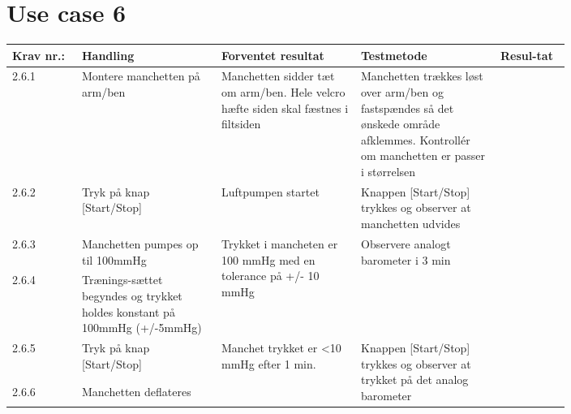 \section{Use case 6}
						\begin{longtable}{|p{0.1\linewidth}|p{0.2\linewidth}|p{0.2\linewidth}|p{0.2\linewidth}|p{0.1\linewidth}|}
								\hline
								\rowcolor{usDef}
								Krav nr.: & Handling & Forventet resultat & Testmetode & Resul-tat  \\\hline
								2.6.1 & Montere manchetten på arm/ben & Manchetten sidder tæt om arm/ben. Hele velcro hæfte siden skal fæstnes i filtsiden & Manchetten trækkes løst over arm/ben og fastspændes så det ønskede område afklemmes. Kontrollér om manchetten er passer i størrelsen & \\ \hline
								2.6.2 & Tryk på knap [Start/Stop] & Luftpumpen startet & Knappen [Start/Stop] trykkes og observer at manchetten udvides  & \\ \hline
								2.6.3 & Manchetten pumpes op til 100mmHg & \multirow{2}{\linewidth}{Trykket i mancheten er 100 mmHg med en tolerance på +/- 10 mmHg}& \multirow{2}{\linewidth}{Observere analogt barometer i 3 min}& \multirow{2}{\linewidth}{} \\ \cline{1-2}
								2.6.4 & Trænings-sættet begyndes og trykket holdes konstant på 100mmHg (+/-5mmHg) & & & \\ \hline
								2.6.5 & Tryk på knap [Start/Stop]  & \multirow{2}{\linewidth}{Manchet trykket er \textless  10 mmHg efter 1 min.} & \multirow{2}{\linewidth}{Knappen [Start/Stop] trykkes og observer at trykket på det analog barometer} & \multirow{2}{\linewidth}{} \\ [2cm] \cline{1-2}
								2.6.6 & Manchetten deflateres  & & & \\ \hline
						\end{longtable}